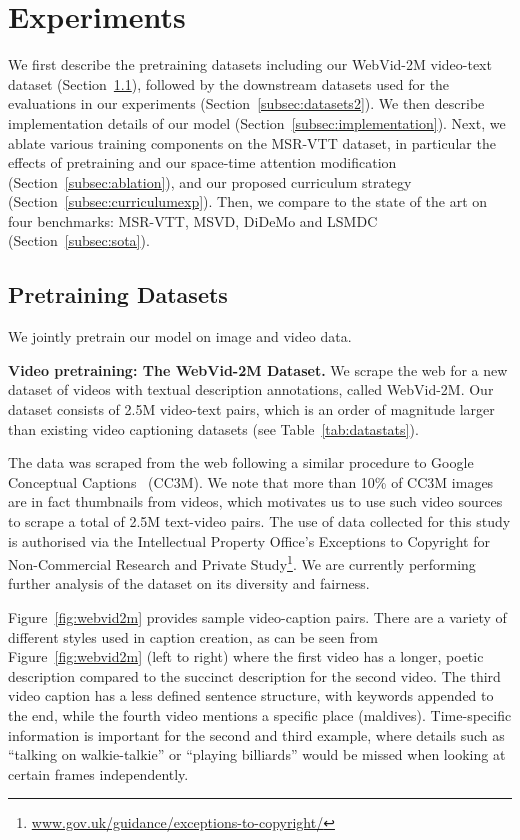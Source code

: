 \section{Experiments}
We first describe the pretraining datasets including our WebVid-2M video-text dataset 
(Section~\ref{subsec:datasets1}), followed by the downstream datasets used for the evaluations
in our experiments (Section~\ref{subsec:datasets2}).
We then describe implementation details of our model (Section~\ref{subsec:implementation}).
Next, we ablate various training components on the MSR-VTT dataset,
in particular the effects of pretraining and our space-time attention modification (Section~\ref{subsec:ablation}),
and our proposed curriculum strategy (Section~\ref{subsec:curriculumexp}).
Then, we compare to the state of the art on
four benchmarks: MSR-VTT, MSVD, DiDeMo and LSMDC (Section~\ref{subsec:sota}).


\subsection{Pretraining Datasets}
\label{subsec:datasets1}
We jointly pretrain our model on image and video data.

\noindent\textbf{Video pretraining: The WebVid-2M Dataset.}
We scrape the web for a new dataset of videos with textual description annotations, called WebVid-2M. Our dataset consists of 2.5M video-text pairs, which is an order of magnitude larger than existing video captioning datasets (see Table~\ref{tab:datastats}).

The data was scraped from the web following a similar procedure to Google Conceptual Captions~\cite{sharma2018conceptual} (CC3M). We note that more than 10\% of CC3M images are in fact thumbnails from videos, which motivates us to use such video sources to scrape a total of 2.5M text-video pairs.
The use of data collected for this study is authorised via the Intellectual Property Office’s Exceptions to Copyright for Non-Commercial Research and Private Study\footnote{\url{www.gov.uk/guidance/exceptions-to-copyright/}}. We are currently performing further analysis of the dataset on its diversity and fairness.

Figure~\ref{fig:webvid2m} provides sample video-caption pairs. There are a variety of different styles used in caption 
creation, as can be seen from Figure~\ref{fig:webvid2m} (left to right) where the first video has a longer, poetic 
description compared to the succinct description for the second video. The third video caption has a less defined sentence 
structure, with keywords appended to the end, while the fourth video mentions a specific place (maldives). Time-specific information is important for the second and third example, where details such as ``talking on walkie-talkie'' or ``playing billiards'' would be missed when looking at certain frames independently.



